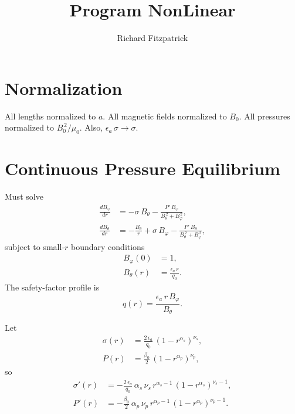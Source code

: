 \documentclass[12pt, oneside]{article}
\title{Program {\sf NonLinear}}
\author{Richard Fitzpatrick}
\date{}
\begin{document}
\maketitle

\section{Normalization}
All lengths normalized to $a$. All magnetic fields normalized to $B_0$. All pressures normalized to $B_0^{\,2}/\mu_0$. Also,
$\epsilon_a\,\sigma\rightarrow \sigma$. 

\section{Continuous Pressure Equilibrium}
Must solve 
\begin{align}
\frac{dB_\varphi}{dr} &= -\sigma\,B_\theta - \frac{P'\,B_\varphi}{B_\theta^{\,2}+B_\varphi^{\,2}},\\[0.5ex]
\frac{dB_\theta}{dr} &= -\frac{B_\theta}{r} + \sigma\,B_\varphi - \frac{P'\,B_\theta}{B_\theta^{\,2}+B_\varphi^{\,2}},
\end{align}
subject to small-$r$ boundary conditions
\begin{align}
B_\varphi(0) &= 1,\\[0.5ex]
B_\theta(r) &= \frac{\epsilon_a\,r}{q_0}.
\end{align}
The safety-factor profile is
\begin{equation}
q(r) = \frac{\epsilon_a\,r\,B_\varphi}{B_\theta}.
\end{equation}

Let
\begin{align}
\sigma(r) &= \frac{2\,\epsilon_a}{q_0}\,(1-r^{\alpha_s})^{\nu_s},\\[0.5ex]
P(r) &= \frac{\beta_0}{2}\,(1-r^{\alpha_p})^{\nu_p},
\end{align}
so
\begin{align}
\sigma'(r) &= -\frac{2\,\epsilon_a}{q_0}\,\alpha_s\,\nu_s\,r^{\alpha_s-1}\,(1-r^{\alpha_s})^{\nu_s-1},\\[0.5ex]
P'(r) &= -\frac{\beta_0}{2}\,\alpha_p\,\nu_p\,r^{\alpha_p-1}\,(1-r^{\alpha_p})^{\nu_p-1}.
\end{align}
\end{document}
